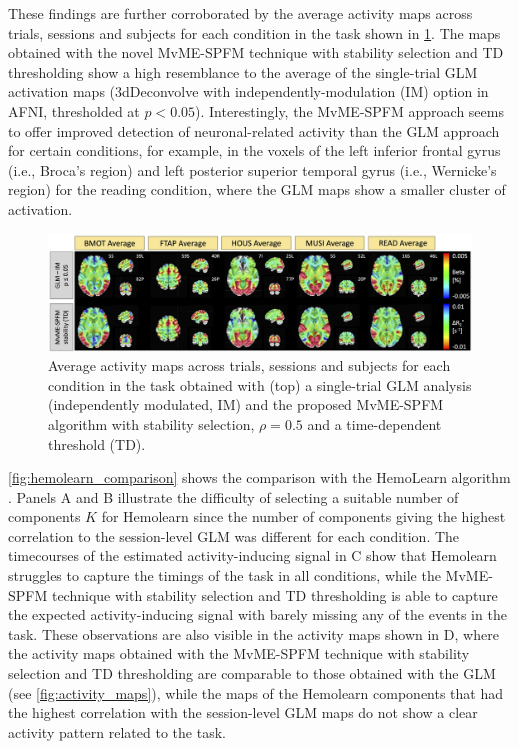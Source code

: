 These findings are further corroborated by the average activity maps across
trials, sessions and subjects for each condition in the task shown in
\cref{fig:group_avg}. The maps obtained with the novel MvME-SPFM technique with
stability selection and TD thresholding show a high resemblance to the average
of the single-trial GLM activation maps (3dDeconvolve with
independently-modulation (IM) option in AFNI, thresholded at $p<0.05$).
Interestingly, the MvME-SPFM approach seems to offer improved detection of
neuronal-related activity than the GLM approach for certain conditions, for
example, in the voxels of the left inferior frontal gyrus (i.e., Broca's region)
and left posterior superior temporal gyrus (i.e., Wernicke's region) for the
reading condition, where the GLM maps show a smaller cluster of activation.

\begin{figure}[ht!]
    \centerline{\includegraphics[width=\textwidth]{figures/multivariate/group_avg.jpg}}
    \caption{Average activity maps across trials, sessions and subjects for each
    condition in the task obtained with (top) a single-trial GLM analysis
    (independently modulated, IM) and the proposed MvME-SPFM algorithm with
    stability selection, $\rho=0.5$ and a time-dependent threshold (TD). }
\label{fig:group_avg}
\end{figure}

\cref{fig:hemolearn_comparison} shows the comparison with the HemoLearn
algorithm \citep{Cherkaoui2021Multivariatesemiblind}. Panels A and B illustrate
the difficulty of selecting a suitable number of components $K$ for Hemolearn
since the number of components giving the highest correlation to the
session-level GLM was different for each condition. The timecourses of the
estimated activity-inducing signal in C show that Hemolearn struggles to capture
the timings of the task in all conditions, while the MvME-SPFM technique with
stability selection and TD thresholding is able to capture the expected
activity-inducing signal with barely missing any of the events in the task.
These observations are also visible in the activity maps shown in D, where the
activity maps obtained with the MvME-SPFM technique with stability selection and
TD thresholding are comparable to those obtained with the GLM (see
\cref{fig:activity_maps}), while the maps of the Hemolearn components that had
the highest correlation with the session-level GLM maps do not show a clear
activity pattern related to the task.

